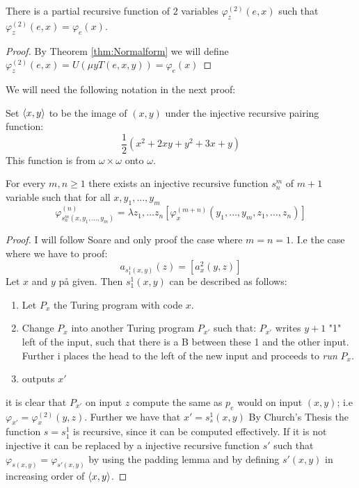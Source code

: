 \documentclass[../main.tex]{subfiles}
\begin{document}
\begin{thm}
	\label{thm:Emu}
	There is a partial recursive function of $2$ variables
	$\varphi_z^{(2)}(e,x)$ such that $\varphi_z^{(2)}(e,x)=\varphi_e(x)$.
\end{thm}
\begin{proof}
	By Theorem \ref{thm:Normalform} we will define
	$\varphi_z^{(2)}(e,x)=U(\mu y T(e,x,y))=\varphi_e(x)$
\end{proof}
We will need the following notation in the next proof:
\begin{defi}
	Set $\langle x,y\rangle$ to be the image of $(x,y)$ under the injective
	recursive  pairing function:
	$$\frac{1}{2}(x^2+2xy+y^2+3x+y)$$
	This function is from $\omega\times\omega$ onto $\omega$.
\end{defi}
\begin{thm}[s-m-n theorem]
	For every $m,n\geq 1$ there exists an injective recursive function
	$s_n^m$ of $m+1$ variable such that for all $x,y_1,\ldots,y_m$
	$$\varphi^{(n)}_{s^m_n(x,y_1,\ldots,y_m)}=\lambda z_1,\ldots
	z_n[\varphi^{(m+n)}_x(y_1,\ldots,y_m,z_1,\ldots,z_n)]$$
\end{thm}
\begin{proof}
	I will follow Soare and only proof the case where $m=n=1$. I.e the case
	where we have to proof:
	$$a_{s^1_1(x,y)}(z)=[a_x^{2}(y,z)]$$
	Let $x$ and $y$ på given. Then $s^1_1(x,y)$ can be described as
	follows:
	\begin{enumerate}
		\item Let $P_x$ the Turing program with code $x$.
		\item Change $P_x$ into another Turing program $P_{x'}$ such
			that: $P_{x'}$ writes $y+1$ "1" left of the input, such
			that there is a B between these 1 and the other input.
			Further i places the head to the left of the new input
			and proceeds to \textit{run} $P_x$.
		\item outputs $x'$
	\end{enumerate}
	it is clear that $P_{x'}$ on input $z$ compute the same as $p_e$ would
	on input $(x,y)$; i.e $\varphi_{x'}=\varphi_x^{(2)}(y,z)$. Further we
	have that $x'=s^1_s(x,y)$
	By Church's Thesis the function $s=s^1_1$ is recursive, since it can be
	computed effectively. If it is not injective it can be replaced by a
	injective recursive function $s'$ such that
	$\varphi_{s(x,y)}=\varphi_{s'(x,y)}$ by using the padding lemma and by
	defining $s'(x,y)$ in increasing order of $\langle x,y\rangle$.
\end{proof}
\end{document}
